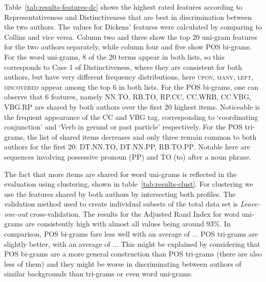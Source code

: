 \documentclass[a4paper,10pt,twoside,fleqn]{article}
\begin{document}
Table~\ref{tab:results-features-dc} shows the highest rated features 
according to Representativeness and Distinctiveness that are best 
in discrimination between the two authors. The values for Dickens' features 
were calculated by comparing to Collins and vice versa. 
Column two and three show the top 20 uni-gram features for the two authors
separately, while column four and five show POS bi-grams. 
For the word uni-grams, 8 of the 20 terms appear in both lists, so this corresponds
to Case 1 of Distinctiveness, where they are consistent for both authors, but
have very different frequency distributions, here \textsc{upon, many, left, discovered}
appear among the top 6 in both lists. 
For the POS bi-grams, one can observe that  6 features, namely
\textsc{NN.TO, RB.TO, RP.CC, CC.WRB, CC.VBG, VBG.RP} 
are shared by both authors over the first 20 highest items. 
Noticeable is the frequent appearance of the CC and VBG tag, 
corresponding to `coordinating conjunction' and `Verb in gerund or
past particle' respectively. 
For the POS tri-grams, the list of shared items decreases and only three remain 
common to both authors for the first 20: \textsc{DT.NN.TO,  DT.NN.PP, RB.TO.PP}.
Notable here are sequences involving possessive pronoun (PP) and TO (to) after 
a noun phrase. 

The fact that more items are shared for word uni-grams is reflected in the evaluation using 
clustering, shown in table~\ref{tab:results-clust}.
For clustering we use the features shared by both authors by intersecting both profiles. 
The validation method used to create individual subsets of the total data set 
is \emph{Leave-one-out} cross-validation. 
The results for the Adjusted Rand Index for word uni-grams are consistently high with 
almost all values being around 93\%. In comparison, POS bi-grams fare less well
with an average of ...
POS tri-grams are slightly better, with an average of ...
This might be explained by considering that POS bi-grams are a more general 
construction than POS tri-grams (there are also less of them) and they might
be worse in discriminating between authors of similar backgrounds 
than tri-grams or even word uni-grams. 
\end{document}
